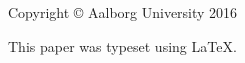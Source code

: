 \thispagestyle{empty}
{\small
\strut\vfill
\noindent Copyright \copyright{} Aalborg University 2016\par
\vspace{0.2cm}
\noindent This paper was typeset using \LaTeX.}
\clearpage